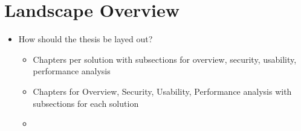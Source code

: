 \hypertarget{landscape-overview}{%
\chapter{Landscape Overview}\label{landscape-overview}}

\begin{itemize}
\tightlist
\item
  How should the thesis be layed out?

  \begin{itemize}
  \tightlist
  \item
    Chapters per solution with subsections for overview, security,
    usability, performance analysis
  \item
    Chapters for Overview, Security, Usability, Performance analysis
    with subsections for each solution
  \item
  \end{itemize}
\end{itemize}
